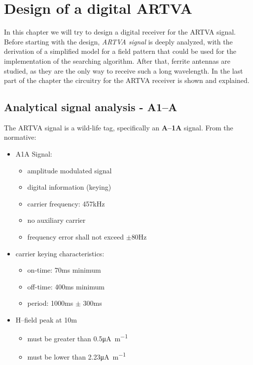 
\chapter{Design of a digital ARTVA \label{ch:chapter2}}
\minitoc
\thispagestyle{plain}
\renewcommand{\arraystretch}{1.75}

In this chapter we will try to design a digital receiver for the ARTVA signal. Before starting with the design, \emph{ARTVA signal} is deeply analyzed, with the derivation of a simplified model for a field pattern that could be used  for the implementation of the searching algorithm. After that, ferrite antennas are studied, as they are the only way to receive such a long wavelength. In the last part of the chapter the circuitry for the ARTVA receiver is shown and explained.



\section{Analytical signal analysis - A1--A \label{sec:a1asegnale}}

The ARTVA signal is a wild-life tag, specifically an \textbf{A--1A} signal. From the normative\cite{NormativaARVA}:
\begin{itemize}
\item A1A Signal:
	\begin{itemize}
	\item amplitude modulated signal
	\item digital information (keying)
	\item carrier frequency: \num{457}\si{\kilo\hertz}
	\item no auxiliary carrier
	\item frequency error shall not exceed $\pm$\num{80}\si{\hertz}
	\end{itemize}
\item carrier keying characteristics:
	\begin{itemize}
	\item on-time: \num{70}\si{\milli\second} minimum
	\item off-time: \num{400}\si{\milli\second} minimum
	\item period: \num{1000}\si{\milli\second} $\pm$ \num{300}\si{\milli\second}
	\end{itemize}
\item H--field peak at \num{10}\si{\meter}
	\begin{itemize}
	\item must be greater than \num{0.5}\si{\micro\ampere\per\meter}
	\item must be lower than \num{2.23}\si{\micro\ampere\per\meter}
	\end{itemize}
\end{itemize}

